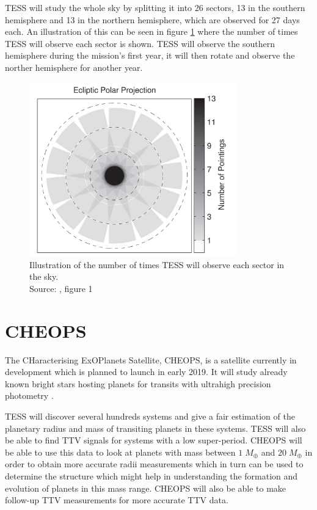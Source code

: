 \documentclass[12pt]{report}
\begin{document}
	TESS will study the whole sky by splitting it into 26 sectors, 13 in the southern hemisphere and 13 in the northern hemisphere, which are observed for 27 days each. An illustration of this can be seen in figure \ref{fig:tess_time} where the number of times TESS will observe each sector is shown. TESS will observe the southern hemisphere during the mission's first year, it will then rotate and observe the norther hemisphere for another year.
	\begin{figure}[h!]
	\centering
		\includegraphics[width=0.8\textwidth]{img/tess_observe_time.png}
		\caption{Illustration of the number of times TESS will observe each sector in the sky.\\ \small{Source: \cite{2015ApJ...809...77S}, figure 1}}
		\label{fig:tess_time}
	\end{figure}	
	
\section{CHEOPS}
	The CHaracterising ExOPlanets Satellite, CHEOPS, is a satellite currently in development which is planned to launch in early 2019. It will study already known bright stars hosting planets for transits with ultrahigh precision photometry \citep{2013EPJWC..4703005B}. 
	
	TESS will discover several hundreds systems and give a fair estimation of the planetary radius and mass of transiting planets in these systems. TESS will also be able to find TTV signals for systems with a low super-period. CHEOPS will be able to use this data to look at planets with mass between $1\; M_{\oplus}$ and $20\; M_{\oplus}$ in order to obtain more accurate radii measurements which in turn can be used to determine the structure which might help in understanding the formation and evolution of planets in this mass range. CHEOPS will also be able to make follow-up TTV measurements for more accurate TTV data.
	
\end{document}
